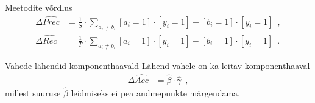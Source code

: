 \documentclass{beamer}
\newcommand{\accuracy}{Acc}
\newcommand{\precision}{Prec}
\newcommand{\recall}{Rec}
\begin{document}
\begin{frame}{Meetodite võrdlus}
    \begin{align*}
        \Delta \widehat{\precision} &= \frac{1}{S} \cdot \sum_{a_i \neq b_i} [a_i = 1] \cdot [y_i=1] - [b_i=1] \cdot [y_i=1] \enspace , \\
        \Delta \widehat{\recall} &= \frac{1}{T} \cdot \sum_{a_i \neq b_i} [a_i = 1] \cdot [y_i = 1] - [b_i = 1] \cdot [y_i = 1] \enspace .
    \end{align*}
\end{frame}

\begin{frame}{Vahede lähendid komponenthaavald}
    Lähend vahele on ka leitav komponenthaaval
    \begin{align*}
        \Delta \widehat{\accuracy} &= \hat{\beta} \cdot \hat{\gamma} \enspace ,
    \end{align*}
    millest suuruse $\hat{\beta}$ leidmiseks ei pea andmepunkte märgendama.
\end{frame}
\end{document}
